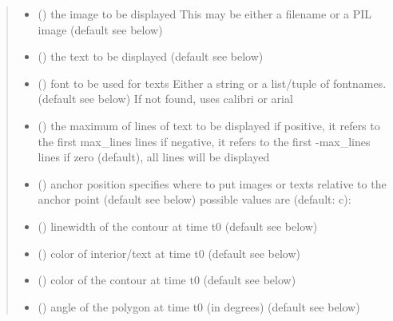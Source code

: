 \documentclass[letterpaper,10pt,english]{sphinxmanual}
\begin{document}
\begin{fulllineitems}
\begin{fulllineitems}
\begin{quote}
\begin{description}
\begin{itemize}
\item {} 
 () \textendash{} the image to be displayed 
This may be either a filename or a PIL image (default see below)

\item {} 
 () \textendash{} the text to be displayed (default see below)

\item {} 
 () \textendash{} font to be used for texts 
Either a string or a list/tuple of fontnames. (default see below)
If not found, uses calibri or arial

\item {} 
 () \textendash{} the maximum of lines of text to be displayed 
if positive, it refers to the first max\_lines lines 
if negative, it refers to the first -max\_lines lines 
if zero (default), all lines will be displayed

\item {} 
 () \textendash{} anchor position 
specifies where to put images or texts relative to the anchor
point (default see below) 
possible values are (default: c): 

\item {} 
 () \textendash{} linewidth of the contour at time t0 (default see below)

\item {} 
 () \textendash{} color of interior/text at time t0 (default see below)

\item {} 
 () \textendash{} color of the contour at time t0 (default see below)

\item {} 
 () \textendash{} angle of the polygon at time t0 (in degrees) (default see below)


\end{itemize}
\end{description}
\end{quote}
\end{fulllineitems}
\end{fulllineitems}
\end{document}
